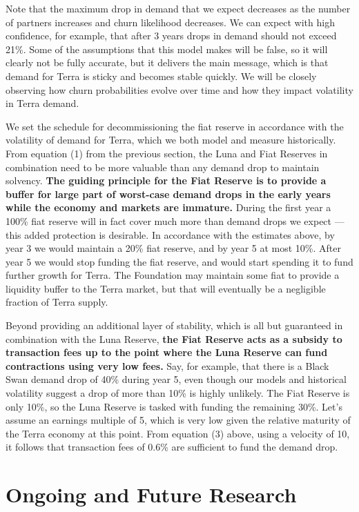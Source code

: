 \documentclass{article}
\begin{document}
Note that the maximum drop in demand that we expect decreases as the number of partners increases and churn likelihood decreases. We can expect with high confidence, for example, that after 3 years drops in demand should not exceed 21\%. Some of the assumptions that this model makes will be false, so it will clearly not be fully accurate, but it delivers the main message, which is that demand for Terra is sticky and becomes stable quickly. We will be closely observing how churn probabilities evolve over time and how they impact volatility in Terra demand.

We set the schedule for decommissioning the fiat reserve in accordance with the volatility of demand for Terra, which we both model and measure historically. From equation (1) from the previous section, the Luna and Fiat Reserves in combination need to be more valuable than any demand drop to maintain solvency. \textbf{The guiding principle for the Fiat Reserve is to provide a buffer for large part of worst-case demand drops in the early years while the economy and markets are immature.} During the first year a 100\% fiat reserve will in fact cover much more than demand drops we expect — this added protection is desirable. In accordance with the estimates above, by year 3 we would maintain a 20\% fiat reserve, and by year 5 at most 10\%. After year 5 we would stop funding the fiat reserve, and would start spending it to fund further growth for Terra. The Foundation may maintain some fiat to provide a liquidity buffer to the Terra market, but that will eventually be a negligible fraction of Terra supply.

Beyond providing an additional layer of stability, which is all but guaranteed in combination with the Luna Reserve, \textbf{the Fiat Reserve acts as a subsidy to transaction fees up to the point where the Luna Reserve can fund contractions using very low fees.} Say, for example, that there is a Black Swan demand drop of 40\% during year 5, even though our models and historical volatility suggest a drop of more than 10\% is highly unlikely. The Fiat Reserve is only 10\%, so the Luna Reserve is tasked with funding the remaining 30\%. Let's assume an earnings multiple of 5, which is very low given the relative maturity of the Terra economy at this point. From equation (3) above, using a velocity of 10, it follows that transaction fees of 0.6\% are sufficient to fund the demand drop. 

\section{Ongoing and Future Research}
\end{document}

